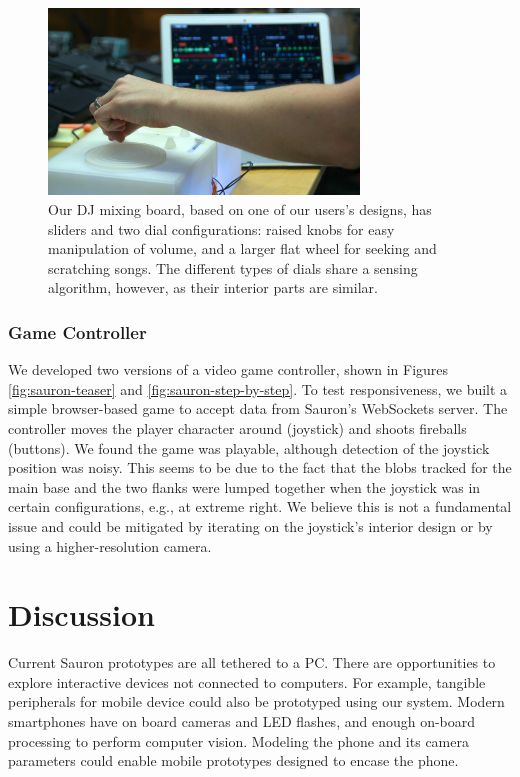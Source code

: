         \begin{figure}
\centering
\includegraphics[width=3.25in]{figures/sauron/DJ-controller-action.JPG}
\caption{Our DJ mixing board, based on one of our users's designs, has sliders and two dial configurations: raised knobs for easy manipulation of volume, and a larger flat wheel for seeking and scratching songs. The different types of dials share a sensing algorithm, however, as their interior parts are similar.}
\label{fig:sauron-djmixer}
\end{figure}
        
        \subsubsection{Game Controller}
        We developed two versions of a video game controller, shown in Figures \ref{fig:sauron-teaser} and \ref{fig:sauron-step-by-step}. To test responsiveness, we built a simple browser-based game to accept data from Sauron's WebSockets server. The controller moves the player character around (joystick) and shoots fireballs (buttons). We found the game was playable, although detection of the joystick position was noisy. This seems to be due to the fact that the blobs tracked for the main base and the two flanks were lumped together when the joystick was in certain configurations, e.g., at extreme right. We believe this is not a fundamental issue and could be mitigated by iterating on the joystick's interior design or by using a higher-resolution camera.

\section{Discussion}

Current Sauron prototypes are all tethered to a PC. There are opportunities to explore interactive devices not connected to computers. For example, tangible peripherals for mobile device could also be prototyped using our system. Modern smartphones have on board cameras and LED flashes, and enough on-board processing to perform computer vision. Modeling the phone and its camera parameters could enable mobile prototypes designed to encase the phone.

